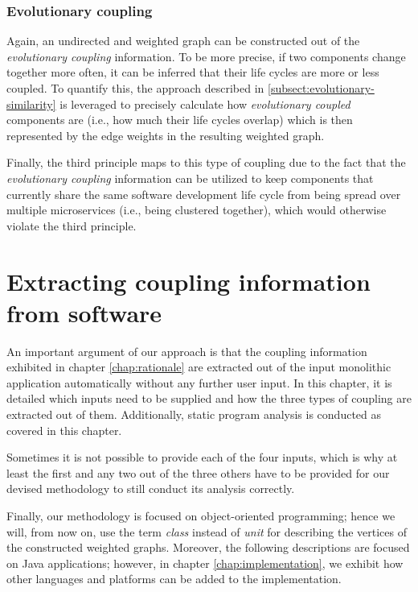 \documentclass[12pt,a4paper]{report}
\begin{document}
\subsection{Evolutionary coupling}

Again, an undirected and weighted graph can be constructed out of the \textit{
evolutionary coupling} information. To be more precise, if two components
change together more often, it can be inferred that their life cycles are more
or less coupled. To quantify this, the approach described in
\ref{subsect:evolutionary-similarity} is leveraged to precisely calculate how
\textit{evolutionary coupled} components are (i.e., how much their life cycles overlap)
which is then represented by the edge weights in the resulting weighted graph.

Finally, the third principle maps to this type of coupling due to the fact that
the \textit{evolutionary coupling} information can be utilized to keep
components that currently share the same software development life cycle from
being spread over multiple microservices (i.e., being clustered together),
which would otherwise violate the third principle.




\chapter{Extracting coupling information from software} \label{chap:extracting-coupling}

An important argument of our approach is that the coupling information
exhibited in chapter \ref{chap:rationale} are extracted out of the input
monolithic application automatically without any further user input. In this
chapter, it is detailed which inputs need to be supplied and how the three
types of coupling are extracted out of them. Additionally, static program
analysis is conducted as covered in this chapter.

Sometimes it is not possible to provide each of the four inputs, which is why
at least the first and any two out of the three others have to be provided for
our devised methodology to still conduct its analysis correctly.

Finally, our methodology is focused on object-oriented programming; hence we
will, from now on, use the term \textit{class} instead of \textit{unit} for
describing the vertices of the constructed weighted graphs. Moreover, the
following descriptions are focused on Java applications; however, in chapter
\ref{chap:implementation}, we exhibit how other languages and platforms can be
added to the implementation.
\end{document}
